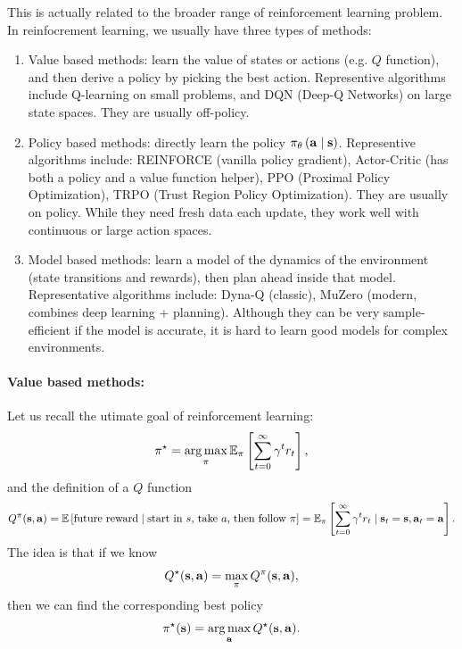 \documentclass[11pt]{article}  %
\begin{document}
This is actually related to the broader range of reinforcement learning problem. 
In reinfocrement learning, we usually have three types of methods:
\begin{enumerate}
  \item Value based methods: learn the value of states or actions (e.g. $Q$ function), and then derive a policy by picking the best action. 
  Representive algorithms include Q-learning on small problems, and DQN (Deep-Q Networks) on large state spaces. 
  They are usually off-policy.

  \item Policy based methods: directly learn the policy $\pi_{\theta}\left( \mathbf{a} \mid \mathbf{s} \right)$. 
  Representive algorithms include: REINFORCE (vanilla policy gradient), Actor-Critic (has both a policy and a value function helper), PPO (Proximal Policy Optimization), TRPO (Trust Region Policy Optimization).
  They are usually on policy. 
  While they need fresh data each update, they work well with continuous or large action spaces.

  \item Model based methods: learn a model of the dynamics of the environment (state transitions and rewards), then plan ahead inside that model.
  Representative algorithms include: Dyna-Q (classic), MuZero (modern, combines deep learning + planning). 
  Although they can be very sample-efficient if the model is accurate, it is hard to learn good models for complex environments.
\end{enumerate}

\paragraph{Value based methods:}
Let us recall the utimate goal of reinforcement learning: 
\begin{align*}
  \pi^\star = \operatorname*{arg\,max}_{\pi} \mathbb{E}_{\pi}\left[\sum_{t=0}^{\infty}\gamma^t r_t\right],
\end{align*}
and the definition of a $Q$ function 
\begin{align*}
  Q^{\pi}(\mathbf{s}, \mathbf{a}) = \mathbb{E}\left[\text{future reward} \mid \text{start in }s \text{, take } a \text{, then follow }\pi\right] = \mathbb{E}_{\pi}\left[\sum_{t=0}^{\infty}\gamma^tr_t \mid \mathbf{s}_t = \mathbf{s}, \mathbf{a}_t = \mathbf{a}\right].
\end{align*}
The idea is that if we know 
\begin{align*}
  Q^\star(\mathbf{s}, \mathbf{a}) = \max_{\pi}Q^{\pi}(\mathbf{s}, \mathbf{a}), 
\end{align*}
then we can find the corresponding best policy 
\begin{align*}
  \pi^\star(\mathbf{s}) = \operatorname*{arg\,max}_{\mathbf{a}} Q^\star(\mathbf{s}, \mathbf{a}).
\end{align*}
\end{document}
